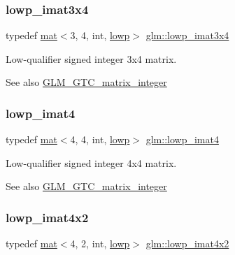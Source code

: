 \subsubsection{\texorpdfstring{lowp\+\_\+imat3x4}{lowp\_imat3x4}}
{\footnotesize\ttfamily typedef \mbox{\hyperlink{structglm_1_1mat}{mat}}$<$3, 4, int, \mbox{\hyperlink{namespaceglm_a36ed105b07c7746804d7fdc7cc90ff25ae161af3fc695e696ce3bf69f7332bc2d}{lowp}}$>$ \mbox{\hyperlink{group__gtc__matrix__integer_gacbdf7f35076058e4e9be49955ab3fbd3}{glm\+::lowp\+\_\+imat3x4}}}

Low-\/qualifier signed integer 3x4 matrix. \begin{DoxySeeAlso}{See also}
\mbox{\hyperlink{group__gtc__matrix__integer}{G\+L\+M\+\_\+\+G\+T\+C\+\_\+matrix\+\_\+integer}} 
\end{DoxySeeAlso}
\mbox{\label{group__gtc__matrix__integer_gaf6a884d14be360b41dc26d59cd732be7}} 
\subsubsection{\texorpdfstring{lowp\+\_\+imat4}{lowp\_imat4}}
{\footnotesize\ttfamily typedef \mbox{\hyperlink{structglm_1_1mat}{mat}}$<$4, 4, int, \mbox{\hyperlink{namespaceglm_a36ed105b07c7746804d7fdc7cc90ff25ae161af3fc695e696ce3bf69f7332bc2d}{lowp}}$>$ \mbox{\hyperlink{group__gtc__matrix__integer_gaf6a884d14be360b41dc26d59cd732be7}{glm\+::lowp\+\_\+imat4}}}

Low-\/qualifier signed integer 4x4 matrix. \begin{DoxySeeAlso}{See also}
\mbox{\hyperlink{group__gtc__matrix__integer}{G\+L\+M\+\_\+\+G\+T\+C\+\_\+matrix\+\_\+integer}} 
\end{DoxySeeAlso}
\mbox{\label{group__gtc__matrix__integer_gad0e232eab19300176c21b9bc1bd7d247}} 
\subsubsection{\texorpdfstring{lowp\+\_\+imat4x2}{lowp\_imat4x2}}
{\footnotesize\ttfamily typedef \mbox{\hyperlink{structglm_1_1mat}{mat}}$<$4, 2, int, \mbox{\hyperlink{namespaceglm_a36ed105b07c7746804d7fdc7cc90ff25ae161af3fc695e696ce3bf69f7332bc2d}{lowp}}$>$ \mbox{\hyperlink{group__gtc__matrix__integer_gad0e232eab19300176c21b9bc1bd7d247}{glm\+::lowp\+\_\+imat4x2}}}

